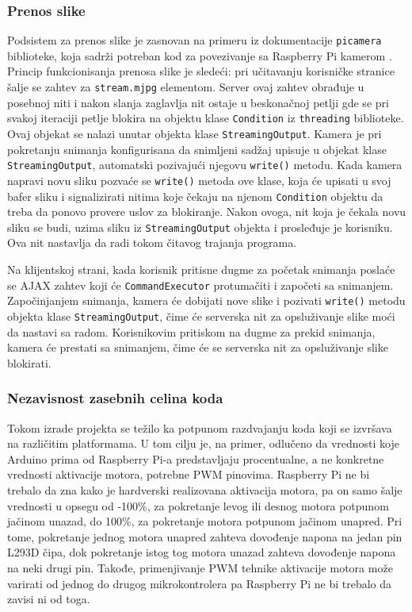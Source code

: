 \documentclass[12pt,a4paper]{report}
\begin{document}
\subsubsection{Prenos slike}

Podsistem za prenos slike je zasnovan na primeru iz dokumentacije \texttt{picamera} biblioteke, koja sadrži potreban kod za povezivanje sa Raspberry Pi kamerom \cite{picamera-lib}. Princip funkcionisanja prenosa slike je sledeći: pri učitavanju korisničke stranice šalje se zahtev za \texttt{stream.mjpg} elementom. Server ovaj zahtev obrađuje u posebnoj niti i nakon slanja zaglavlja nit ostaje u beskonačnoj petlji gde se pri svakoj iteraciji petlje blokira na objektu klase \texttt{Condition} iz \texttt{threading} biblioteke. Ovaj objekat se nalazi unutar objekta klase \texttt{StreamingOutput}. Kamera je pri pokretanju snimanja konfigurisana da snimljeni sadžaj upisuje u objekat klase \texttt{StreamingOutput}, automatski pozivajući njegovu \texttt{write()} metodu. Kada kamera napravi novu sliku pozvaće se \texttt{write()} metoda ove klase, koja će upisati u svoj bafer sliku i signalizirati nitima koje čekaju na njenom \texttt{Condition} objektu da treba da ponovo provere uslov za blokiranje. Nakon ovoga, nit koja je čekala novu sliku se budi, uzima sliku iz \texttt{StreamingOutput} objekta i prosleđuje je korisniku. Ova nit nastavlja da radi tokom čitavog trajanja programa. 

Na klijentskoj strani, kada korisnik pritisne dugme za početak snimanja poslaće se AJAX zahtev koji će \texttt{CommandExecutor} protumačiti i započeti sa snimanjem. Započinjanjem snimanja, kamera će dobijati nove slike i pozivati \texttt{write()} metodu objekta klase \texttt{StreamingOutput}, čime će serverska nit za opsluživanje slike moći da nastavi sa radom. Korisnikovim pritiskom na dugme za prekid snimanja, kamera će prestati sa snimanjem, čime će se serverska nit za opsluživanje slike blokirati.

\subsubsection{Nezavisnost zasebnih celina koda}
Tokom izrade projekta se težilo ka potpunom razdvajanju koda koji se izvršava na različitim platformama. U tom cilju je, na primer, odlučeno da vrednosti koje Arduino prima od Raspberry Pi-a predstavljaju procentualne, a ne konkretne vrednosti aktivacije motora, potrebne PWM pinovima. Raspberry Pi ne bi trebalo da zna kako je hardverski realizovana aktivacija motora, pa on samo šalje vrednosti u opsegu od -100\%, za pokretanje levog ili desnog motora potpunom jačinom unazad, do 100\%, za pokretanje motora potpunom jačinom unapred. Pri tome, pokretanje jednog motora unapred zahteva dovođenje napona na jedan pin L293D čipa, dok pokretanje istog tog motora unazad zahteva dovođenje napona na neki drugi pin. Takođe, primenjivanje PWM tehnike aktivacije motora može varirati od jednog do drugog mikrokontrolera pa Raspberry Pi ne bi trebalo da zavisi ni od toga.
\end{document}

